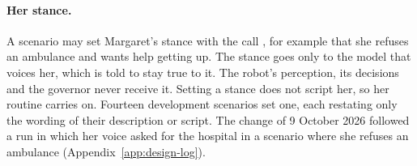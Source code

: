 \paragraph{Her stance.} A scenario may set Margaret's stance with the call ,
for example that she refuses an ambulance and wants help getting up.
The stance goes only to the model that voices her, which is told to stay true to it.
The robot's perception, its decisions and the governor never receive it.
Setting a stance does not script her, so her routine carries on.
Fourteen development scenarios set one, each restating only the wording of their description or
script.
The change of 9 October 2026 followed a run in which her voice asked for the hospital in a
scenario where she refuses an ambulance (Appendix~\ref{app:design-log}).

